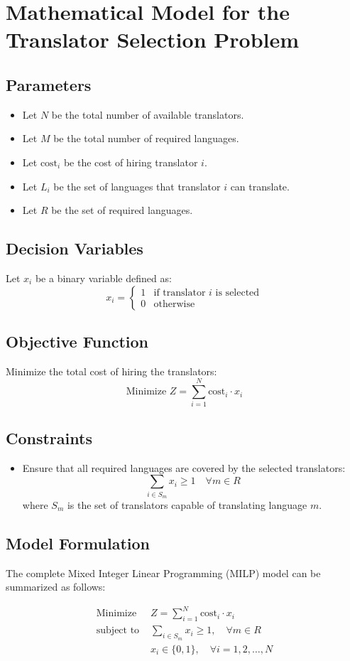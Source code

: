 \documentclass{article}
\begin{document}
\section*{Mathematical Model for the Translator Selection Problem}

\subsection*{Parameters}
\begin{itemize}
    \item Let \( N \) be the total number of available translators.
    \item Let \( M \) be the total number of required languages.
    \item Let \( \text{cost}_i \) be the cost of hiring translator \( i \).
    \item Let \( L_i \) be the set of languages that translator \( i \) can translate.
    \item Let \( R \) be the set of required languages.
\end{itemize}

\subsection*{Decision Variables}
Let \( x_i \) be a binary variable defined as:
\[
x_i = 
\begin{cases} 
1 & \text{if translator } i \text{ is selected} \\
0 & \text{otherwise}
\end{cases}
\]

\subsection*{Objective Function}
Minimize the total cost of hiring the translators:
\[
\text{Minimize } Z = \sum_{i=1}^{N} \text{cost}_i \cdot x_i
\]

\subsection*{Constraints}
\begin{itemize}
    \item Ensure that all required languages are covered by the selected translators:
    \[
    \sum_{i \in S_m} x_i \geq 1 \quad \forall m \in R
    \]
    where \( S_m \) is the set of translators capable of translating language \( m \).
\end{itemize}

\subsection*{Model Formulation}
The complete Mixed Integer Linear Programming (MILP) model can be summarized as follows:

\begin{align*}
\text{Minimize } & Z = \sum_{i=1}^{N} \text{cost}_i \cdot x_i \\
\text{subject to } & \sum_{i \in S_m} x_i \geq 1, \quad \forall m \in R \\
& x_i \in \{0, 1\}, \quad \forall i = 1, 2, \ldots, N
\end{align*}
\end{document}
